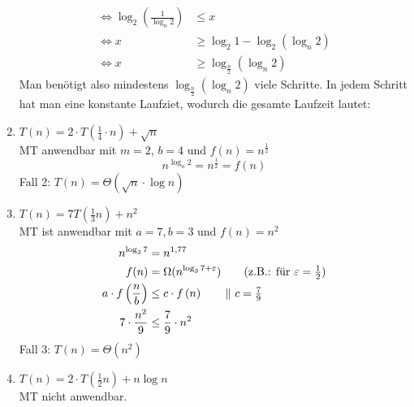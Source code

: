 \documentclass[a4paper,10pt]{scrartcl}
\begin{document}
\begin{enumerate}
\begin{align*}
         \Leftrightarrow \log_2 \left(\frac{1}{\log_n 2}\right) &\leq x \\
         \Leftrightarrow x &\geq \log_2 1 - \log_2 (\log_n 2) \\
         \Leftrightarrow x &\geq \log_{\frac{n}{2}} (\log_n 2)
        \end{align*}
        Man benötigt also mindestens $\log_{\frac{n}{2}} (\log_n 2)$ viele Schritte. In jedem Schritt hat man eine konstante Laufziet, wodurch die gesamte Laufzeit lautet:
\item   $T(n) = 2 \cdot T\left(\frac{1}{4} \cdot n\right) + \sqrt{n}$\\
        MT anwendbar mit $m = 2$, $b = 4$ und $f(n) = n^{\frac{1}{2}}$\\
        \[ n^{\log_n 2} = n^{\frac{1}{2}} = f(n) \]
        Fall 2: $T(n) = \Theta(\sqrt{n} \cdot \log n)$
\item   $T(n) = 7 T(\frac{1}{3}n) + n^2$\\
        MT ist anwendbar mit $a = 7, b = 3$ und $f(n) = n^2$
        \begin{align*}
        n^{\log_3 7} &= n^{1,77}\\
        f(n) &= \Omega(n^{\log_3 7 + \varepsilon}) \tag{z.B.: für $\varepsilon = \frac{1}{2}$}\\
            a \cdot f\left(\frac{n}{b}\right) &\leq c \cdot f\left(n\right) \tag*{$\|\ c = \frac{7}{9}$} \\
            7 \cdot \frac{n^2}{9} &\leq \frac{7}{9} \cdot n^2
        \end{align*}
        Fall 3: $T(n) = \Theta(n^2)$
\item   $T(n) = 2 \cdot T\left(\frac{1}{2}n\right) + n \log n$\\
    MT nicht anwendbar.\\
        \begin{center}
        \end{center}
    

\end{enumerate}
\end{document}
